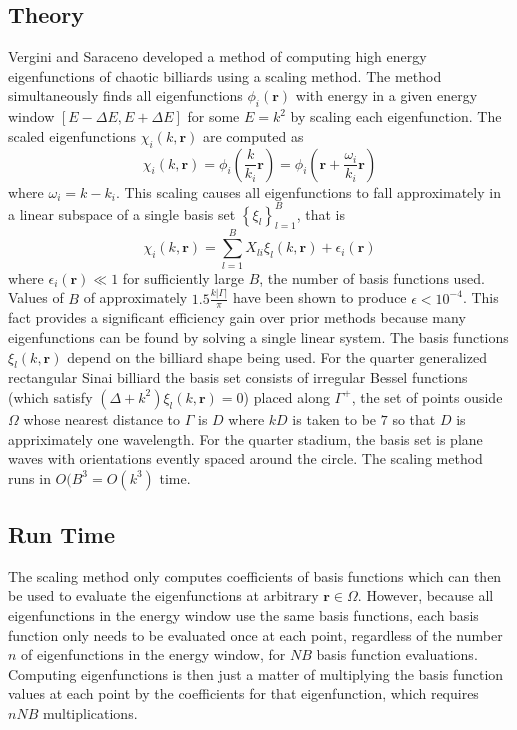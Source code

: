 \documentclass{report}
\newcommand{\rr}[0]{\mathbf{r}}
\begin{document}
\subsection{Theory}
Vergini and Saraceno \cite{vergini} developed a method of computing high energy eigenfunctions of chaotic billiards using a scaling method. The method simultaneously finds all eigenfunctions $\phi_{i}(\rr)$ with energy in a given energy window $[E - \Delta E, E + \Delta E]$ for some $E = k^{2}$ by scaling each eigenfunction. The scaled eigenfunctions $\chi_{i}(k, \rr)$ are computed as
\[
\chi_{i}(k, \rr) = \phi_{i} \left( \frac{k}{k_{i}} \rr \right) = \phi_{i} \left( \rr + \frac{\omega_{i}}{k_i} \rr \right)
\]
where $\omega_{i} = k - k_i$. This scaling causes all eigenfunctions to fall approximately in a linear subspace of a single basis set $\left\{ \xi_{l} \right\}_{l=1}^{B}$, that is
\[
\chi_{i}(k, \rr) = \sum_{l=1}^{B} X_{li} \xi_{l}(k, \rr) + \epsilon_{i}(\rr)
\]
where $\epsilon_{i}(\rr) \ll 1$ for sufficiently large $B$, the number of basis functions used. Values of $B$ of approximately $1.5 \frac{k \vert \Gamma \vert}{\pi}$ have been shown to produce $\epsilon < 10^{-4}$. This fact provides a significant efficiency gain over prior methods because many eigenfunctions can be found by solving a single linear system. The basis functions $\xi_{l}(k, \rr)$ depend on the billiard shape being used. For the quarter generalized rectangular Sinai billiard the basis set consists of irregular Bessel functions (which satisfy $(\Delta + k^2)\xi_{l}(k, \rr) = 0$) placed along $\Gamma^{+}$, the set of points ouside $\Omega$ whose nearest distance to $\Gamma$ is $D$ where $kD$ is taken to be $7$ so that $D$ is appriximately one wavelength. For the quarter stadium, the basis set is plane waves with orientations evently spaced around the circle. The scaling method runs in $O(B^{3} = O(k^{3})$ time. \cite{barnett}

\subsection{Run Time}
The scaling method only computes coefficients of basis functions which can then be used to evaluate the eigenfunctions at arbitrary $\rr \in \Omega$. However, because all eigenfunctions in the energy window use the same basis functions, each basis function only needs to be evaluated once at each point, regardless of the number $n$ of eigenfunctions in the energy window, for $NB$ basis function evaluations. Computing eigenfunctions is then just a matter of multiplying the basis function values at each point by the coefficients for that eigenfunction, which requires $nNB$ multiplications.
\end{document}
